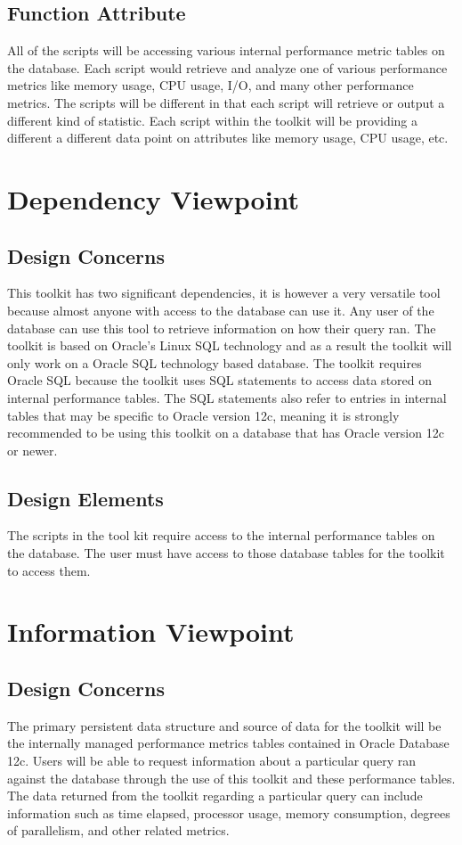 \documentclass[draftclsnofoot, onecolumn, compsoc, 10pt]{IEEEtran}
\begin{document}
\subsection{Function Attribute}
All of the scripts will be accessing various internal performance metric tables on the database. Each script would retrieve and analyze one of various performance metrics like memory usage, CPU usage, I/O, and many other performance metrics.
The scripts will be different in that each script will retrieve or output a different kind of statistic.
Each script  within the toolkit will be providing a different a different data point on attributes like memory usage, CPU usage, etc.

\section{Dependency Viewpoint}
\subsection{Design Concerns}
This toolkit has two significant dependencies, it is however a very versatile tool because almost anyone with access to the database can use it.
Any user of the database can use this tool to retrieve information on how their query ran.
The toolkit is based on Oracle's Linux SQL technology and as a result the toolkit will only work on a Oracle SQL technology based database.
The toolkit requires Oracle SQL because the toolkit uses SQL statements to access data stored on internal performance tables.
The SQL statements also refer to entries in internal tables that may be specific to Oracle version 12c, meaning it is strongly recommended to be using this toolkit on a database that has Oracle version 12c or newer. 
\subsection{Design Elements}
The scripts in the tool kit require access to the internal performance tables on the database. The user must have access to those database tables for the toolkit to access them. 


\section{Information Viewpoint}
\subsection{Design Concerns}
The primary persistent data structure and source of data for the toolkit will be the internally managed performance metrics tables contained in Oracle Database 12c.
Users will be able to request information about a particular query ran against the database through the use of this toolkit and these performance tables.
The data returned from the toolkit regarding a particular query can include information such as time elapsed, processor usage, memory consumption, degrees of parallelism, and other related metrics.
\end{document}
